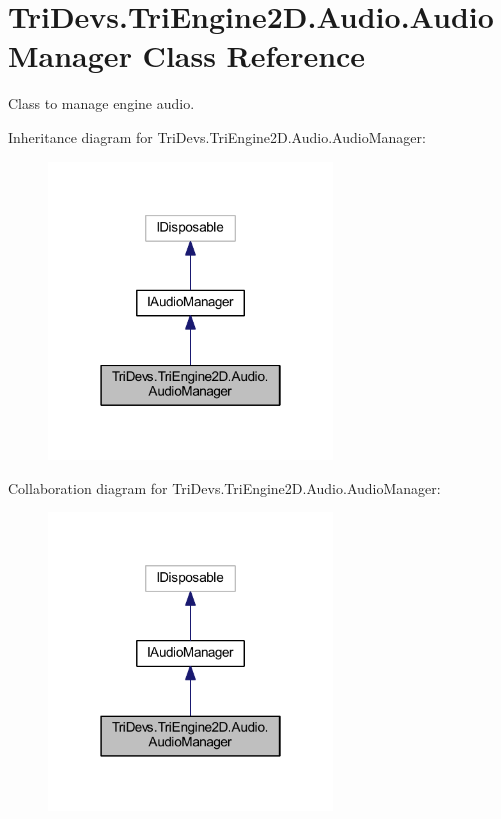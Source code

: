\hypertarget{class_tri_devs_1_1_tri_engine2_d_1_1_audio_1_1_audio_manager}{\section{Tri\-Devs.\-Tri\-Engine2\-D.\-Audio.\-Audio\-Manager Class Reference}
\label{class_tri_devs_1_1_tri_engine2_d_1_1_audio_1_1_audio_manager}
}


Class to manage engine audio.  




Inheritance diagram for Tri\-Devs.\-Tri\-Engine2\-D.\-Audio.\-Audio\-Manager\-:
\nopagebreak
\begin{figure}[H]
\begin{center}
\leavevmode
\includegraphics[width=214pt]{class_tri_devs_1_1_tri_engine2_d_1_1_audio_1_1_audio_manager__inherit__graph}
\end{center}
\end{figure}


Collaboration diagram for Tri\-Devs.\-Tri\-Engine2\-D.\-Audio.\-Audio\-Manager\-:
\nopagebreak
\begin{figure}[H]
\begin{center}
\leavevmode
\includegraphics[width=214pt]{class_tri_devs_1_1_tri_engine2_d_1_1_audio_1_1_audio_manager__coll__graph}
\end{center}
\end{figure}
